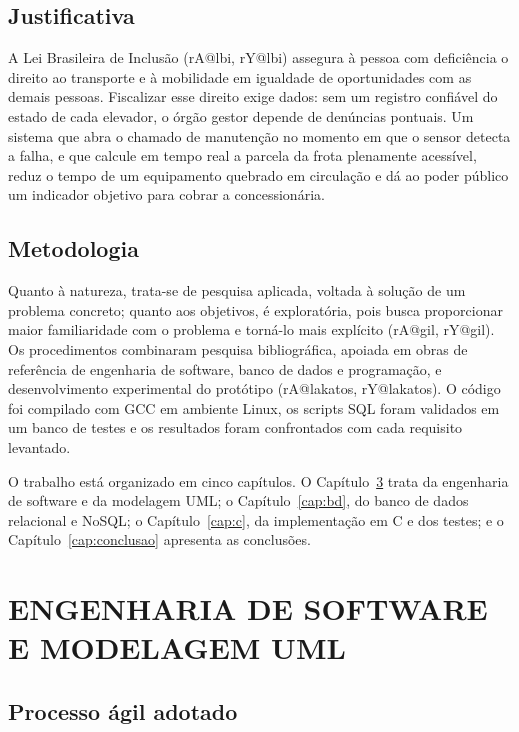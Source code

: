 \documentclass[12pt,a4paper,oneside]{report}
\makeatletter
\renewcommand{\cite}[1]{(\csname rA@#1\endcsname, \csname rY@#1\endcsname)}
\makeatother
\begin{document}
\section{Justificativa}

A Lei Brasileira de Inclusão \cite{lbi} assegura à pessoa com deficiência o direito ao transporte e à
mobilidade em igualdade de oportunidades com as demais pessoas. Fiscalizar esse direito exige dados: sem
um registro confiável do estado de cada elevador, o órgão gestor depende de denúncias pontuais. Um sistema
que abra o chamado de manutenção no momento em que o sensor detecta a falha, e que calcule em tempo real
a parcela da frota plenamente acessível, reduz o tempo de um equipamento quebrado em circulação e dá ao
poder público um indicador objetivo para cobrar a concessionária.

\section{Metodologia}

Quanto à natureza, trata-se de pesquisa aplicada, voltada à solução de um problema concreto; quanto aos
objetivos, é exploratória, pois busca proporcionar maior familiaridade com o problema e torná-lo mais
explícito \cite{gil}. Os procedimentos combinaram pesquisa bibliográfica, apoiada em obras de referência
de engenharia de software, banco de dados e programação, e desenvolvimento experimental do protótipo
\cite{lakatos}. O código foi compilado com GCC em ambiente Linux, os scripts SQL foram validados em um
banco de testes e os resultados foram confrontados com cada requisito levantado.

O trabalho está organizado em cinco capítulos. O Capítulo~\ref{cap:eng} trata da engenharia de software e
da modelagem UML; o Capítulo~\ref{cap:bd}, do banco de dados relacional e NoSQL; o
Capítulo~\ref{cap:c}, da implementação em C e dos testes; e o Capítulo~\ref{cap:conclusao} apresenta as
conclusões.

\chapter{ENGENHARIA DE SOFTWARE E MODELAGEM UML}\label{cap:eng}

\section{Processo ágil adotado}
\end{document}
